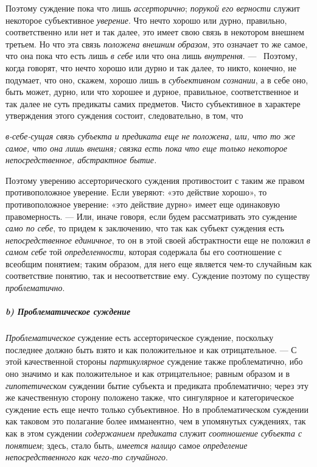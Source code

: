 \documentclass[twoside]{article}
\begin{document}
{{Поэтому суждение пока что лишь
{\em ассерторично};
{\em порукой его верности
}служит некоторое субъективное
{\em уверение}. Что нечто
хорошо или дурно, правильно, соответственно или нет и так далее, это имеет
свою связь в некотором внешнем третьем. Но что эта связь
{\em положена внешним образом},
это означает то же самое, что она пока что есть лишь
{\em в себе} или что она
лишь {\em внутрення}. —
\ Поэтому, когда говорят, что нечто хорошо или дурно и так
далее, то никто, конечно, не подумает, что оно, скажем, хорошо лишь в
{\em субъективном сознании},
а в себе оно, быть может, дурно, или что хорошее и дурное,
правильное, соответственное и так далее не суть предикаты самих предметов.
Чисто субъективное в характере утверждения этого суждения состоит,
следовательно, в том, что
{\em в-себе-сущая
связь субъекта и предиката еще не
{\em положена}, или, что
то же самое, что она лишь {\em внешня};
связка есть пока что еще только некоторое непосредственное,
{\em абстрактное бытие}.

Поэтому уверению ассерторического суждения противостоит с
таким же правом противоположное уверение. Если уверяют: «это действие
хорошо», то противоположное уверение: «это действие дурно» имеет еще
одинаковую правомерность. — Или, иначе говоря, если будем
рассматривать это суждение {\em само по
себе}, то придем к заключению, что так как субъект суждения
есть {\em непосредственное единичное},
то он в этой своей абстрактности еще не положил
{\em в самом себе} той
{\em определенности},
которая содержала бы его соотношение с всеобщим понятием;
таким образом, для него еще является чем-то случайным как соответствие
понятию, так и несоответствие ему. Суждение поэтому по существу
{\em проблематично}.

\subparagraph[b) Проблематическое суждение]{b) Проблематическое суждение}
{\em Проблематическое}
суждение есть ассерторическое суждение, поскольку последнее
должно быть взято и как положительное и как отрицательное. —
С этой качественной стороны
{\em партикулярное}
суждение также проблематично, ибо оно значимо и как
положительное и как отрицательное; равным образом и в
{\em гипотетическом}
суждении бытие субъекта и предиката проблематично; через эту
же качественную сторону положено также, что сингулярное и категорическое
суждение есть еще нечто только субъективное. Но в проблематическом суждении
как таковом это полагание более имманентно, чем в упомянутых суждениях, так
как в этом суждении {\em содержанием
предиката} служит
{\em соотношение
}{\em субъекта с понятием};
здесь, стало быть,
{\em имеется налицо}
самое {\em определение
непосредственного как чего-то случайного}.

}}}
\end{document}
